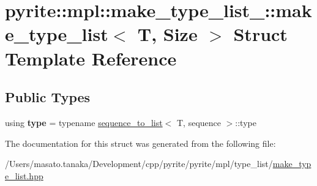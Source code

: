 \hypertarget{structpyrite_1_1mpl_1_1make__type__list___1_1make__type__list}{}\section{pyrite\+:\+:mpl\+:\+:make\+\_\+type\+\_\+list\+\_\+\+:\+:make\+\_\+type\+\_\+list$<$ T, Size $>$ Struct Template Reference}
\label{structpyrite_1_1mpl_1_1make__type__list___1_1make__type__list}
\subsection*{Public Types}
\begin{DoxyCompactItemize}
\item 
\mbox{\label{structpyrite_1_1mpl_1_1make__type__list___1_1make__type__list_abb4c4527365bf27071ec6f54206bdf34}} 
using {\bfseries type} = typename \mbox{\hyperlink{structpyrite_1_1mpl_1_1make__type__list___1_1sequence__to__list}{sequence\+\_\+to\+\_\+list}}$<$ T, sequence $>$\+::type
\end{DoxyCompactItemize}


The documentation for this struct was generated from the following file\+:\begin{DoxyCompactItemize}
\item 
/\+Users/masato.\+tanaka/\+Development/cpp/pyrite/pyrite/mpl/type\+\_\+list/\mbox{\hyperlink{make__type__list_8hpp}{make\+\_\+type\+\_\+list.\+hpp}}\end{DoxyCompactItemize}
